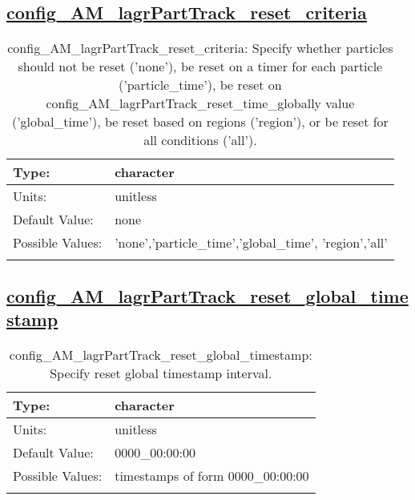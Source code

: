 \subsection[config\_AM\_lagrPartTrack\_reset\_criteria]{\hyperref[sec:nm_tab_AM_lagrPartTrack]{config\_AM\_lagrPartTrack\_reset\_criteria}}
\label{subsec:nm_sec_config_AM_lagrPartTrack_reset_criteria}
\begin{center}
\begin{longtable}{| p{2.0in} || p{4.0in} |}
    \hline
    Type: & character \\
    \hline
    Units: & \si{unitless} \\
    \hline
    Default Value: & none \\
    \hline
    Possible Values: & 'none','particle\_time','global\_time', 'region','all' \\
    \hline
    \caption{config\_AM\_lagrPartTrack\_reset\_criteria: Specify whether particles should not be reset ('none'), be reset on a timer for each particle ('particle\_time'), be reset on config\_AM\_lagrPartTrack\_reset\_time\_globally value ('global\_time'), be reset based on regions ('region'), or be reset for all conditions ('all').}
\end{longtable}
\end{center}
\subsection[config\_AM\_lagrPartTrack\_reset\_global\_timestamp]{\hyperref[sec:nm_tab_AM_lagrPartTrack]{config\_AM\_lagrPartTrack\_reset\_global\_timestamp}}
\label{subsec:nm_sec_config_AM_lagrPartTrack_reset_global_timestamp}
\begin{center}
\begin{longtable}{| p{2.0in} || p{4.0in} |}
    \hline
    Type: & character \\
    \hline
    Units: & \si{unitless} \\
    \hline
    Default Value: & 0000\_00:00:00 \\
    \hline
    Possible Values: & timestamps of form 0000\_00:00:00 \\
    \hline
    \caption{config\_AM\_lagrPartTrack\_reset\_global\_timestamp: Specify reset global timestamp interval.}
\end{longtable}
\end{center}
